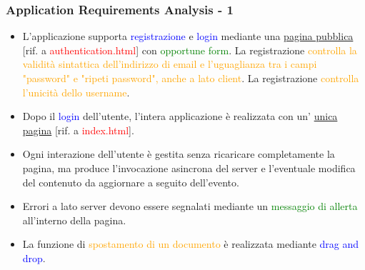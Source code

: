 \documentclass[aspectratio=169, dvipsnames]{beamer}
\begin{document}
\begin{frame}
    \frametitle{Application Requirements Analysis - 1}
    \begin{itemize}
        \item L'applicazione supporta \textcolor{Blue}{registrazione} e \textcolor{Blue}{login} mediante una
              \underline{pagina pubblica} [rif. a \textcolor{Red}{authentication.html}] con
              \textcolor{Green}{opportune form}. La registrazione \textcolor{Orange}{controlla la validità sintattica
                  dell'indirizzo di email e l'uguaglianza tra i campi "password" e "ripeti password", anche a lato client}.
              La registrazione \textcolor{Orange}{controlla l’unicità dello username}.
        \item Dopo il \textcolor{Blue}{login} dell'utente, l'intera applicazione è realizzata con un'
              \underline{unica pagina} [rif. a \textcolor{Red}{index.html}].
        \item Ogni interazione dell'utente è gestita senza ricaricare completamente la pagina, ma produce
              l'invocazione asincrona del server e l'eventuale modifica del contenuto da aggiornare a
              seguito dell'evento.
        \item Errori a lato server devono essere segnalati mediante un \textcolor{Green}{messaggio di allerta}
              all'interno della pagina.
        \item La funzione di \textcolor{Orange}{spostamento di un documento} è realizzata mediante
              \textcolor{Blue}{drag and drop}.
    \end{itemize}
\end{frame}
\end{document}
